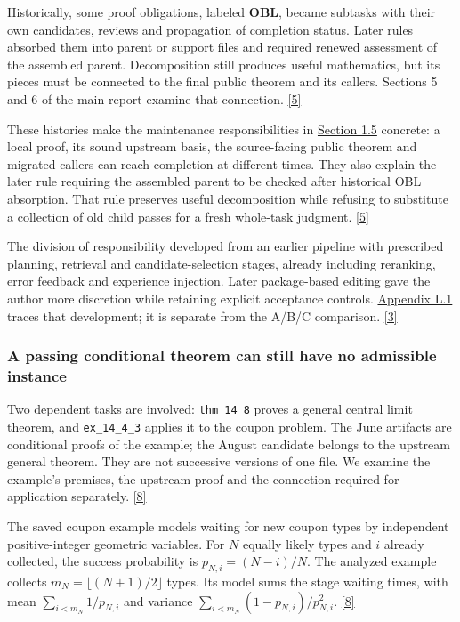 Historically, some proof obligations, labeled \textbf{OBL}, became subtasks with their own candidates, reviews and propagation of completion status. Later rules absorbed them into parent or support files and required renewed assessment of the assembled parent. Decomposition still produces useful mathematics, but its pieces must be connected to the final public theorem and its callers. Sections 5 and 6 of the main report examine that connection. \href{en.pdf\#ref-5}{\mbox{[5]}}

These histories make the maintenance responsibilities in \href{en.pdf\#section-1-5}{Section 1.5} concrete: a local proof, its sound upstream basis, the source-facing public theorem and migrated callers can reach completion at different times. They also explain the later rule requiring the assembled parent to be checked after historical OBL absorption. That rule preserves useful decomposition while refusing to substitute a collection of old child passes for a fresh whole-task judgment. \href{en.pdf\#ref-5}{\mbox{[5]}}

The division of responsibility developed from an earlier pipeline with prescribed planning, retrieval and candidate-selection stages, already including reranking, error feedback and experience injection. Later package-based editing gave the author more discretion while retaining explicit acceptance controls. \href{en-appendix.pdf\#l1}{Appendix L.1} traces that development; it is separate from the A/B/C comparison. \href{en.pdf\#ref-3}{\mbox{[3]}}

\subsubsection[A passing conditional theorem can still have no admissible instance]{\texorpdfstring{\protect\hypertarget{r3-3}{}A passing conditional theorem can still have no admissible instance}{A passing conditional theorem can still have no admissible instance}}
Two dependent tasks are involved: \nolinkurl{thm_14_8} proves a general central limit theorem, and \nolinkurl{ex_14_4_3} applies it to the coupon problem. The June artifacts are conditional proofs of the example; the August candidate belongs to the upstream general theorem. They are not successive versions of one file. We examine the example’s premises, the upstream proof and the connection required for application separately. \href{en.pdf\#ref-8}{\mbox{[8]}}

The saved coupon example models waiting for new coupon types by independent positive-integer geometric variables. For $N$ equally likely types and $i$ already collected, the success probability is $p_{N,i}=(N-i)/N$. The analyzed example collects $m_N=\lfloor(N+1)/2\rfloor$ types. Its model sums the stage waiting times, with mean $\sum_{i<m_N}1/p_{N,i}$ and variance $\sum_{i<m_N}(1-p_{N,i})/p_{N,i}^2$. \href{en.pdf\#ref-8}{\mbox{[8]}}

